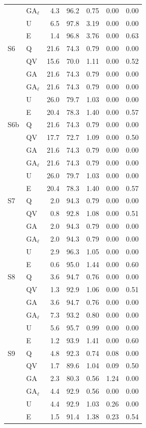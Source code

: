 \begin{tabular}{@{}llrrrrr@{}}
 & GA$_\ell$ & 4.3 & 96.2 & 0.75 & 0.00 & 0.00 \\
 & U & 6.5 & 97.8 & 3.19 & 0.00 & 0.00 \\
 & E & 1.4 & 96.8 & 3.76 & 0.00 & 0.63 \\
\addlinespace[2pt]
S6 & Q & 21.6 & 74.3 & 0.79 & 0.00 & 0.00 \\
 & QV & 15.6 & 70.0 & 1.11 & 0.00 & 0.52 \\
 & GA & 21.6 & 74.3 & 0.79 & 0.00 & 0.00 \\
 & GA$_\ell$ & 21.6 & 74.3 & 0.79 & 0.00 & 0.00 \\
 & U & 26.0 & 79.7 & 1.03 & 0.00 & 0.00 \\
 & E & 20.4 & 78.3 & 1.40 & 0.00 & 0.57 \\
\addlinespace[2pt]
S6b & Q & 21.6 & 74.3 & 0.79 & 0.00 & 0.00 \\
 & QV & 17.7 & 72.7 & 1.09 & 0.00 & 0.50 \\
 & GA & 21.6 & 74.3 & 0.79 & 0.00 & 0.00 \\
 & GA$_\ell$ & 21.6 & 74.3 & 0.79 & 0.00 & 0.00 \\
 & U & 26.0 & 79.7 & 1.03 & 0.00 & 0.00 \\
 & E & 20.4 & 78.3 & 1.40 & 0.00 & 0.57 \\
\addlinespace[2pt]
S7 & Q & 2.0 & 94.3 & 0.79 & 0.00 & 0.00 \\
 & QV & 0.8 & 92.8 & 1.08 & 0.00 & 0.51 \\
 & GA & 2.0 & 94.3 & 0.79 & 0.00 & 0.00 \\
 & GA$_\ell$ & 2.0 & 94.3 & 0.79 & 0.00 & 0.00 \\
 & U & 2.9 & 96.3 & 1.05 & 0.00 & 0.00 \\
 & E & 0.6 & 95.0 & 1.44 & 0.00 & 0.60 \\
\addlinespace[2pt]
S8 & Q & 3.6 & 94.7 & 0.76 & 0.00 & 0.00 \\
 & QV & 1.3 & 92.9 & 1.06 & 0.00 & 0.51 \\
 & GA & 3.6 & 94.7 & 0.76 & 0.00 & 0.00 \\
 & GA$_\ell$ & 7.3 & 93.2 & 0.80 & 0.00 & 0.00 \\
 & U & 5.6 & 95.7 & 0.99 & 0.00 & 0.00 \\
 & E & 1.2 & 93.9 & 1.41 & 0.00 & 0.60 \\
\addlinespace[2pt]
S9 & Q & 4.8 & 92.3 & 0.74 & 0.08 & 0.00 \\
 & QV & 1.7 & 89.6 & 1.04 & 0.09 & 0.50 \\
 & GA & 2.3 & 80.3 & 0.56 & 1.24 & 0.00 \\
 & GA$_\ell$ & 4.4 & 92.9 & 0.56 & 0.00 & 0.00 \\
 & U & 4.4 & 92.9 & 1.03 & 0.26 & 0.00 \\
 & E & 1.5 & 91.4 & 1.38 & 0.23 & 0.54 \\
\bottomrule
\end{tabular}